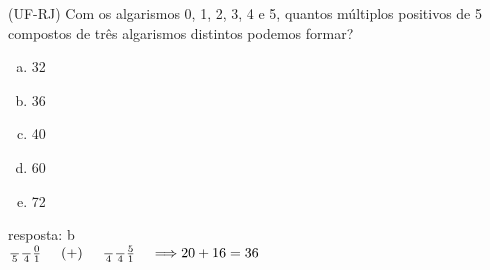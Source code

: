 \begin{ex}
(UF-RJ) Com os algarismos 0, 1, 2, 3, 4 e 5, quantos múltiplos positivos de 5 compostos de três algarismos distintos podemos formar?
   \begin{enumerate}[(a)]
   \item 32
   \item 36
   \item 40
   \item 60
   \item 72
   \end{enumerate}
     \begin{sol}
      resposta: b \\
       $\frac{\phantom{A}}{5}\frac{\phantom{A}}{4}\frac{0}{1}\hspace{0,5cm}(+)\hspace{0,5cm}\frac{\phantom{A}}{4}\frac{\phantom{A}}{4}\frac{5}{1}\hspace{0,4cm} \Longrightarrow 20+16=36$
     \end{sol}
\end{ex}